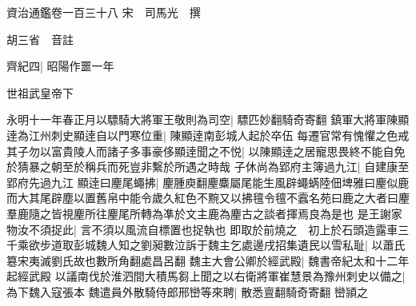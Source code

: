 資治通鑑卷一百三十八
宋　司馬光　撰

胡三省　音註

齊紀四|{
	昭陽作噩一年}


世祖武皇帝下

永明十一年春正月以驃騎大將軍王敬則為司空|{
	驃匹妙翻騎奇寄翻}
鎮軍大將軍陳顯逹為江州刺史顯逹自以門寒位重|{
	陳顯逹南彭城人起於卒伍}
每遷官常有愧懼之色戒其子勿以富貴陵人而諸子多事豪侈顯逹聞之不悦|{
	以陳顯逹之居寵思畏終不能自免於猜暴之朝至於稱兵而死豈非繫於所遇之時哉}
子休尚為郢府主簿過九江|{
	自建康至郢府先過九江}
顯逹曰麈尾蠅拂|{
	麈腫庾翻麈麋屬尾能生風辟蠅蜹陸佃埤雅曰麈似鹿而大其尾辟塵以置舊帛中能令歲久紅色不黦又以拂氊令氊不蠧名苑曰鹿之大者曰麈羣鹿隨之皆視麈所往麈尾所轉為凖於文主鹿為麈古之談者揮焉良為是也}
是王謝家物汝不須捉此|{
	言不須以風流自標置也捉執也}
即取於前燒之　初上於石頭造露車三千乘欲步道取彭城魏人知之劉昶數泣訴于魏主乞處邊戌招集遺民以雪私耻|{
	以蕭氏簒宋夷滅劉氏故也數所角翻處昌呂翻}
魏主大會公卿於經武殿|{
	魏書帝紀太和十二年起經武殿}
以議南伐於淮泗間大積馬芻上聞之以右衛將軍崔慧景為豫州刺史以備之|{
	為下魏入寇張本}
魏遣員外散騎侍郎邢巒等來聘|{
	散悉亶翻騎奇寄翻}
巒頴之

